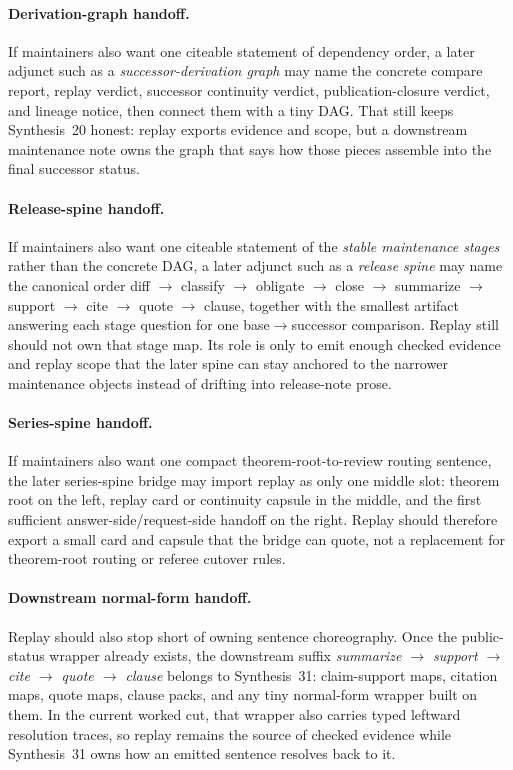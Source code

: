 \documentclass[11pt]{article}
\begin{document}
\paragraph{Derivation-graph handoff.}
If maintainers also want one citeable statement of dependency order, a later adjunct such as a \emph{successor-derivation graph} may name the concrete compare report, replay verdict, successor continuity verdict, publication-closure verdict, and lineage notice, then connect them with a tiny DAG. That still keeps Synthesis~20 honest: replay exports evidence and scope, but a downstream maintenance note owns the graph that says how those pieces assemble into the final successor status.\cite{series:workedexample,series:planstateequiv}


\paragraph{Release-spine handoff.}
If maintainers also want one citeable statement of the \emph{stable maintenance stages} rather than the concrete DAG, a later adjunct such as a \emph{release spine} may name the canonical order diff $\to$ classify $\to$ obligate $\to$ close $\to$ summarize $\to$ support $\to$ cite $\to$ quote $\to$ clause, together with the smallest artifact answering each stage question for one base$\to$successor comparison. Replay still should not own that stage map. Its role is only to emit enough checked evidence and replay scope that the later spine can stay anchored to the narrower maintenance objects instead of drifting into release-note prose.\cite{series:workedexample,series:planstateequiv}

\paragraph{Series-spine handoff.}
If maintainers also want one compact theorem-root-to-review routing sentence, the later series-spine bridge may import replay as only one middle slot: theorem root on the left, replay card or continuity capsule in the middle, and the first sufficient answer-side/request-side handoff on the right. Replay should therefore export a small card and capsule that the bridge can quote, not a replacement for theorem-root routing or referee cutover rules.\cite{series:seriesspines}

\paragraph{Downstream normal-form handoff.}
Replay should also stop short of owning sentence choreography.
Once the public-status wrapper already exists, the downstream suffix
\emph{summarize $\to$ support $\to$ cite $\to$ quote $\to$ clause}
belongs to Synthesis~31: claim-support maps, citation maps, quote maps, clause packs, and any tiny normal-form wrapper built on them.
In the current worked cut, that wrapper also carries typed leftward resolution traces, so replay remains the source of checked evidence while Synthesis~31 owns how an emitted sentence resolves back to it.\cite{series:downstreamnormalforms,series:workedexample,series:planstateequiv}
\end{document}
